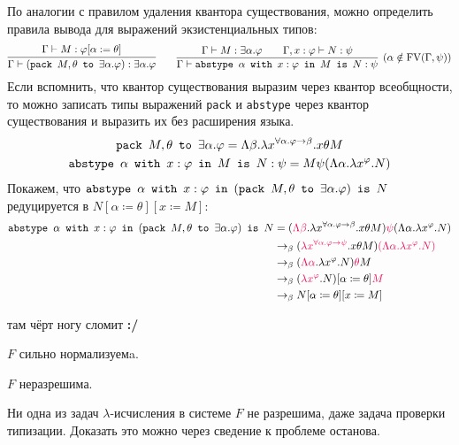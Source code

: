 По аналогии с правилом удаления квантора существования, можно определить правила вывода для выражений экзистенциальных типов:
\[
    \infer{\Gamma\vdash (\pack{M, \theta}{\exists \alpha . \varphi}) : \exists \alpha.\varphi}
        {\Gamma \vdash M : \varphi[\alpha := \theta]} \qquad
    \infer[(\alpha \notin \FV(\Gamma, \psi))]
        {\Gamma \vdash \abstype{\alpha}{x:\varphi}{M}{N:\psi}}
        {\Gamma \vdash M : \exists \alpha . \varphi && \Gamma, x : \varphi \vdash N : \psi}
\]
Если вспомнить, что квантор существования выразим через квантор всеобщности, то можно записать типы выражений
\texttt{pack} и \texttt{abstype} через квантор существования и выразить их без расширения языка.
\begin{gather*}
    \mathinner{\mathtt{pack}}~M, \theta~\mathinner{\mathtt{to}}~\exists \alpha . \varphi =
        \Lambda \beta . \lambda x^{\forall \alpha . \varphi \to \beta} . x \theta M \\
    \mathinner{\mathtt{abstype}}~\alpha~\mathinner{\mathtt{with}}~x : \varphi~\mathinner{\mathtt{in}}~M~\mathinner{\mathtt{is}}~N:\psi =
        M \psi (\Lambda \alpha . \lambda x ^ \varphi . N)
\end{gather*}
Покажем, что $\mathinner{\mathtt{abstype}}~\alpha~\mathinner{\mathtt{with}}~x:\varphi~\mathinner{\mathtt{in}}~(\mathinner{\mathtt{pack}}~M,\theta~\mathinner{\mathtt{to}}~\exists\alpha .\varphi)~\mathinner{\mathtt{is}}~N$
        редуцируется в $N[\alpha\coloneqq\theta][x\coloneqq M]$:
\begin{align*}
    \abstype{\alpha}{x:\varphi}{(\pack{M,\theta}{\exists\alpha .\varphi})}{N}
    &= (\reduction{\Lambda \beta} . \lambda x^{\forall \alpha . \varphi \to \beta} . x \theta M)
        \reduction{\psi} (\Lambda \alpha . \lambda x ^ \varphi . N) \\
    &\to_\beta (\reduction{\lambda x^{\forall \alpha . \varphi \to \psi}} . x \theta M)
        \reduction{(\Lambda \alpha . \lambda x ^ \varphi . N)} \\
    &\to_\beta (\reduction{\Lambda \alpha} . \lambda x^\varphi . N) \reduction\theta M \\
    &\to_\beta (\reduction{\lambda x^\varphi} . N)[\alpha\coloneqq\theta] \reduction M \\
    &\to_\beta N[\alpha\coloneqq\theta][x\coloneqq M]
\end{align*}

\begin{example} \todo там чёрт ногу сломит \textbf{:/}
\end{example}

\begin{statement}
    $F$ сильно нормализуемa.
\end{statement}

\begin{statement}
    $F$ неразрешима.
\end{statement}
Ни одна из задач $\lambda$-исчисления в системе $F$ не разрешима, даже задача проверки типизации.
Доказать это можно через сведение к проблеме останова.

